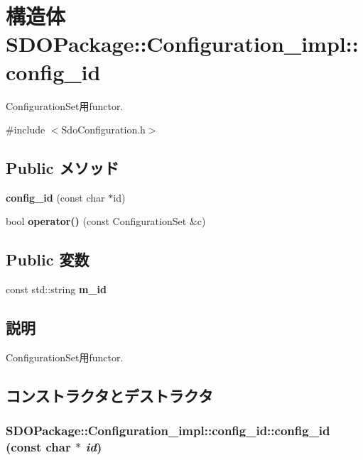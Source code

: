 \section{構造体 SDOPackage::Configuration\_\-impl::config\_\-id}
\label{structSDOPackage_1_1Configuration__impl_1_1config__id}


ConfigurationSet用functor.  




{\ttfamily \#include $<$SdoConfiguration.h$>$}

\subsection*{Public メソッド}
\begin{DoxyCompactItemize}
\item 
{\bf config\_\-id} (const char $\ast$id)
\item 
bool {\bf operator()} (const ConfigurationSet \&c)
\end{DoxyCompactItemize}
\subsection*{Public 変数}
\begin{DoxyCompactItemize}
\item 
const std::string {\bf m\_\-id}
\end{DoxyCompactItemize}


\subsection{説明}
ConfigurationSet用functor. 

\subsection{コンストラクタとデストラクタ}
\subsubsection[{config\_\-id}]{\setlength{\rightskip}{0pt plus 5cm}SDOPackage::Configuration\_\-impl::config\_\-id::config\_\-id (const char $\ast$ {\em id})\hspace{0.3cm}{\ttfamily  [inline]}}\label{structSDOPackage_1_1Configuration__impl_1_1config__id_a5a00969e9d9c016597921bdab51db000}


